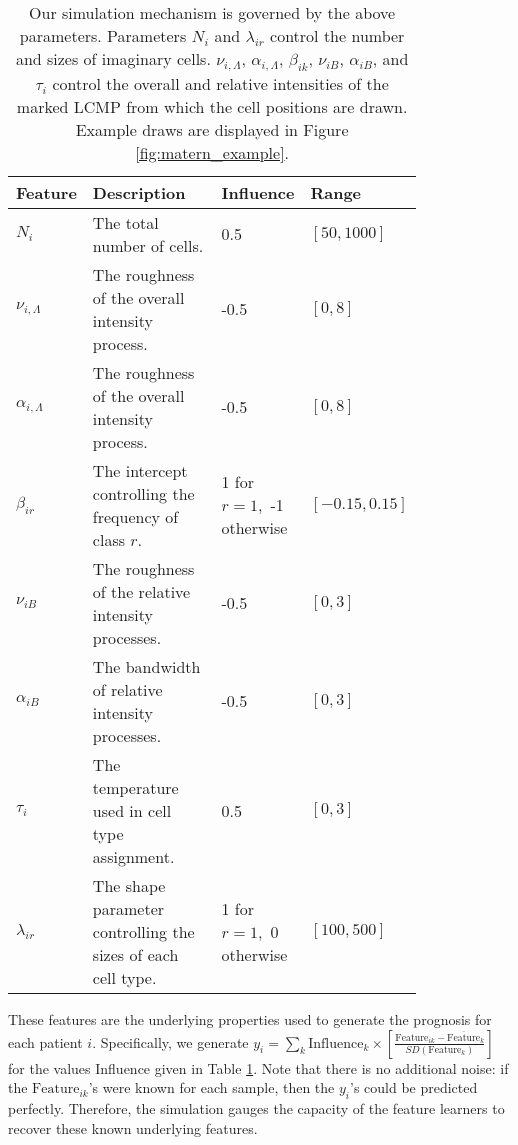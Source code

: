 \begin{table}[]
\begin{tabular}{|p{0.1\linewidth}|p{0.4\linewidth}|p{0.16\linewidth}|p{0.15\linewidth}|}
\hline
\textbf{Feature}              & \textbf{Description}                                 & \textbf{Influence}          & \textbf{Range}             \\
\hline
$N_i$                & The total number of cells.                                    & 0.5                         & $\left[50, 1000\right]$    \\
\hline
$\nu_{i,\Lambda}$    & The roughness of the overall intensity process.            & -0.5                        & $\left[0, 8\right]$        \\
\hline
$\alpha_{i,\Lambda}$ & The roughness of the overall intensity process.            & -0.5                        & $\left[0, 8\right]$        \\
\hline
$\beta_{ir}$             & The intercept controlling the frequency of class $r$. & 1 for $r = 1$,\ -1 otherwise & $\left[-0.15, 0.15\right]$ \\
\hline
$\nu_{iB}$           & The roughness of the relative intensity processes.            & -0.5                        & $\left[0, 3\right]$        \\
\hline
$\alpha_{iB}$        & The bandwidth of relative intensity processes.                & -0.5                        & $\left[0, 3\right]$        \\
\hline
$\tau_{i}$           & The temperature used in cell type assignment.                 & 0.5                         & $\left[0, 3\right]$        \\
\hline
$\lambda_{ir}$       & The shape parameter controlling the sizes of each cell type.  & 1 for $r = 1$,\ 0 otherwise  & $\left[100, 500\right]$   \\
\hline
\end{tabular}
\caption{Our simulation mechanism is governed by the above parameters.
  Parameters $N_i$ and $\lambda_{ir}$ control the number and sizes of imaginary
  cells. $\nu_{i, \Lambda}$, $\alpha_{i, \Lambda}$, $\beta_{ik}$, $\nu_{iB}$,
  $\alpha_{iB}$, and $\tau_{i}$ control the overall and relative intensities of
  the marked LCMP from which the cell positions are drawn. Example draws are
  displayed in Figure \ref{fig:matern_example}.}
\label{tab:sim_params}
\end{table}

These features are the underlying properties used to generate the prognosis for
each patient $i$. Specifically, we generate $y_i = \sum_{k} \text{Influence}_{k}
\times \left[\frac{\text{Feature}_{ik} -
    \overline{\text{Feature}}_{k}}{SD\left(\text{Feature}_{k}\right)}\right]$ for the
values Influence given in Table \ref{tab:sim_params}. Note that there is no
additional noise: if the $\text{Feature}_{ik}$'s were known for each sample,
then the $y_{i}$'s could be predicted perfectly. Therefore, the simulation
gauges the capacity of the feature learners to recover these known underlying
features.

